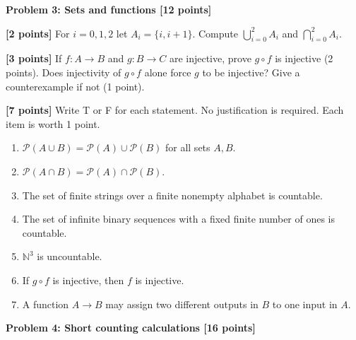 \documentclass[12pt,letterpaper]{article}
\newcommand{\problemheading}[2][5\baselineskip]{\Needspace{#1}\par\noindent\hspace*{-0.625in}\textbf{#2}\par\nobreak\vspace{0.3em}}
\newcommand{\examspace}[1]{\par\vspace*{#1cm}}
\begin{document}
\clearpage
\vspace*{0.21in}
\problemheading{Problem 3: Sets and functions [12 points]}
\begin{list}{}{\setlength{\leftmargin}{0.25in}\setlength{\rightmargin}{0.25in}}\item[]
\begin{description}[font=\normalfont,leftmargin=1.2em,labelsep=0.4em]
\item[(a)] \textbf{[2 points]} For $i=0,1,2$ let $A_i=\{i,i+1\}$. Compute $\bigcup_{i=0}^2A_i$ and $\bigcap_{i=0}^2A_i$.
\examspace{3}
\Needspace{\dimexpr 5cm+4\baselineskip\relax}
\item[(b)] \textbf{[3 points]} If $f:A\to B$ and $g:B\to C$ are injective, prove $g\circ f$ is injective (2 points). Does injectivity of $g\circ f$ alone force $g$ to be injective? Give a counterexample if not (1 point).
\examspace{5}
\Needspace{\dimexpr 1cm+4\baselineskip\relax}
\item[(c)] \textbf{[7 points]} Write T or F for each statement. No justification is required. Each item is worth 1 point.\begin{enumerate}[label=(\roman*)]\item $\mathcal P(A\cup B)=\mathcal P(A)\cup\mathcal P(B)$ for all sets $A,B$.\item $\mathcal P(A\cap B)=\mathcal P(A)\cap\mathcal P(B)$.\item The set of finite strings over a finite nonempty alphabet is countable.\item The set of infinite binary sequences with a fixed finite number of ones is countable.\item $\mathbb N^3$ is uncountable.\item If $g\circ f$ is injective, then $f$ is injective.\item A function $A\to B$ may assign two different outputs in $B$ to one input in $A$.\end{enumerate}
\examspace{1}
\end{description}
\end{list}
\clearpage
\vspace*{0.21in}
\problemheading{Problem 4: Short counting calculations [16 points]}
\end{document}

